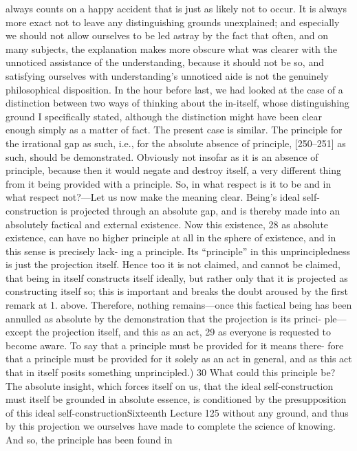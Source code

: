 always counts on a happy accident that is just as likely not to occur. It is
always more exact not to leave any distinguishing grounds unexplained; and
especially we should not allow ourselves to be led astray by the fact that often,
and on many subjects, the explanation makes more obscure what was clearer
with the unnoticed assistance of the understanding, because it should not be
so, and satisfying ourselves with understanding’s unnoticed aide is not the
genuinely philosophical disposition. In the hour before last, we had looked at
the case of a distinction between two ways of thinking about the in-itself,
whose distinguishing ground I specifically stated, although the distinction
might have been clear enough simply as a matter of fact. The present case is
similar. The principle for the irrational gap as such, i.e., for the absolute
absence of principle, [250–251] as such, should be demonstrated. Obviously
not insofar as it is an absence of principle, because then it would negate and
destroy itself, a very different thing from it being provided with a principle.
So, in what respect is it to be and in what respect not?—Let us now make the
meaning clear. Being’s ideal self-construction is projected through an
absolute gap, and is thereby made into an absolutely factical and external
existence. Now this existence, 28 as absolute existence, can have no higher
principle at all in the sphere of existence, and in this sense is precisely lack-
ing a principle. Its “principle” in this unprincipledness is just the projection
itself. Hence too it is not claimed, and cannot be claimed, that being in itself
constructs itself ideally, but rather only that it is projected as constructing
itself so; this is important and breaks the doubt aroused by the first remark
at 1. above. Therefore, nothing remains—once this factical being has been
annulled as absolute by the demonstration that the projection is its princi-
ple—except the projection itself, and this as an act, 29 as everyone is requested
to become aware. To say that a principle must be provided for it means there-
fore that a principle must be provided for it solely as an act in general, and as
this act that in itself posits something unprincipled.) 30
What could this principle be? The absolute insight, which forces itself
on us, that the ideal self-construction must itself be grounded in absolute
essence, is conditioned by the presupposition of this ideal self-constructionSixteenth Lecture
125
without any ground, and thus by this projection we ourselves have made to
complete the science of knowing. And so, the principle has been found in
